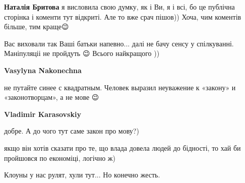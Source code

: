 \begin{itemize}
\begin{itemize}
\textbf{Наталія Бритова} я висловила свою думку, як і Ви, я і всі, бо це публічна сторінка і коменти тут відкриті. Але то вже срач пішов)) Хоча, чим коментів більше, тим краще😉

 
Вас виховали так Ваші батьки напевно... далі не бачу сенсу у спілкуванні.
Маніпуляціі не пройдуть 😉 Всього найкращого ))

 
\textbf{Vasylyna Nakonechna} 

не путайте синее с квадратным. Человек выразил неуважение к «закону» и
«законотворцам», а не мове 😉


 
\textbf{Vladimir Karasovskiy} 

добре. А до чого тут саме закон про мову?)

якщо він хотів сказати про те, що влада довела людей до бідності, то хай би
пройшовся по економіці, логічно ж)

\end{itemize}

 
Клоуны у нас рулят, хули тут... Но конечно жесть.

 

\end{itemize}
